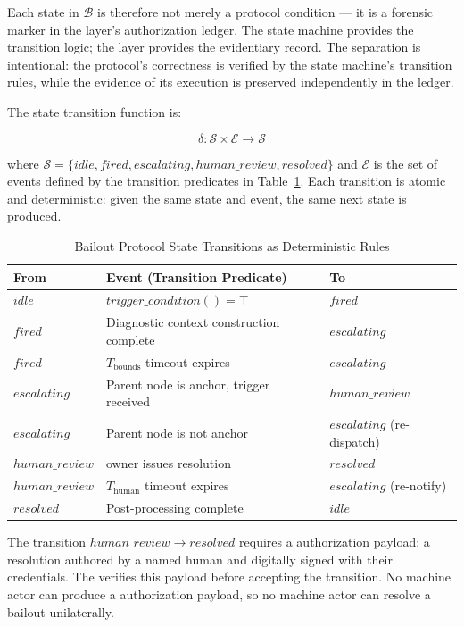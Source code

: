 Each state in $\mathcal{B}$ is therefore not merely a protocol condition — it is a forensic marker in the \fact{} layer's authorization ledger. The state machine provides the transition logic; the \fact{} layer provides the evidentiary record. The separation is intentional: the protocol's correctness is verified by the state machine's transition rules, while the evidence of its execution is preserved independently in the ledger.

The state transition function is:

\begin{equation}
\delta: \mathcal{S} \times \mathcal{E} \rightarrow \mathcal{S}
\end{equation}

where $\mathcal{S} = \{idle, fired, escalating, human\_review, resolved\}$ and $\mathcal{E}$ is the set of events defined by the transition predicates in Table~\ref{tab:bailout-transitions}. Each transition is atomic and deterministic: given the same state and event, the same next state is produced.

\begin{table}[H]
\centering
\caption{Bailout Protocol State Transitions as Deterministic \fact{} Rules}
\label{tab:bailout-transitions}
\begin{tabular}{@{}lp{5.5cm}l@{}}
\toprule
\textbf{From} & \textbf{Event (Transition Predicate)} & \textbf{To} \\
\midrule
$idle$ & $trigger\_condition() = \top$ & $fired$ \\
$fired$ & Diagnostic context construction complete & $escalating$ \\
$fired$ & $T_{\text{bounds}}$ timeout expires & $escalating$ \\
$escalating$ & Parent node is \purpose{} anchor, trigger received & $human\_review$ \\
$escalating$ & Parent node is not \purpose{} anchor & $escalating$ (re-dispatch) \\
$human\_review$ & \purpose{} owner issues resolution & $resolved$ \\
$human\_review$ & $T_{\text{human}}$ timeout expires & $escalating$ (re-notify) \\
$resolved$ & Post-processing complete & $idle$ \\
\bottomrule
\end{tabular}
\end{table}

The transition $human\_review \rightarrow resolved$ requires a \purpose{} authorization payload: a resolution authored by a named human and digitally signed with their \purpose{} credentials. The \fact{} verifies this payload before accepting the transition. No machine actor can produce a \purpose{} authorization payload, so no machine actor can resolve a bailout unilaterally.

